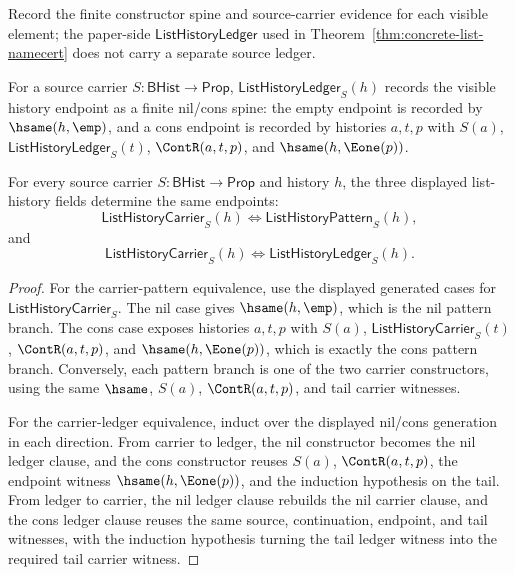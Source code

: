 \begin{definition}
\label{def:list-ledger-policy}
Record the finite constructor spine and source-carrier evidence for each visible element; the paper-side $\mathsf{ListHistoryLedger}$ used in Theorem~\ref{thm:concrete-list-namecert} does not carry a separate source ledger.
\end{definition}

\begin{definition}
\label{def:list-history-ledger}
For a source carrier $S:\mathsf{BHist}\to\mathsf{Prop}$,
$\mathsf{ListHistoryLedger}_S(h)$ records the visible history endpoint as a
finite nil/cons spine: the empty endpoint is recorded by $\hsame(h,\emp)$, and
a cons endpoint is recorded by histories $a,t,p$ with $S(a)$,
$\mathsf{ListHistoryLedger}_S(t)$, $\ContR(a,t,p)$, and
$\hsame(h,\Eone(p))$.
\end{definition}

\begin{theorem}
\label{thm:list-history-carrier-pattern-ledger-equivalence}
For every source carrier $S:\mathsf{BHist}\to\mathsf{Prop}$ and history $h$,
the three displayed list-history fields determine the same endpoints:
$$
  \mathsf{ListHistoryCarrier}_S(h)
  \Longleftrightarrow
  \mathsf{ListHistoryPattern}_S(h),
$$
and
$$
  \mathsf{ListHistoryCarrier}_S(h)
  \Longleftrightarrow
  \mathsf{ListHistoryLedger}_S(h).
$$
\end{theorem}
\begin{proof}
For the carrier-pattern equivalence, use the displayed generated cases for
$\mathsf{ListHistoryCarrier}_S$. The nil case gives $\hsame(h,\emp)$, which is
the nil pattern branch. The cons case exposes histories $a,t,p$ with $S(a)$,
$\mathsf{ListHistoryCarrier}_S(t)$, $\ContR(a,t,p)$, and
$\hsame(h,\Eone(p))$, which is exactly the cons pattern branch. Conversely,
each pattern branch is one of the two carrier constructors, using the same
$\hsame$, $S(a)$, $\ContR(a,t,p)$, and tail carrier witnesses.

For the carrier-ledger equivalence, induct over the displayed nil/cons
generation in each direction. From carrier to ledger, the nil constructor
becomes the nil ledger clause, and the cons constructor reuses $S(a)$,
$\ContR(a,t,p)$, the endpoint witness $\hsame(h,\Eone(p))$, and the induction
hypothesis on the tail. From ledger to carrier, the nil ledger clause rebuilds
the nil carrier clause, and the cons ledger clause reuses the same source,
continuation, endpoint, and tail witnesses, with the induction hypothesis
turning the tail ledger witness into the required tail carrier witness.
\end{proof}

